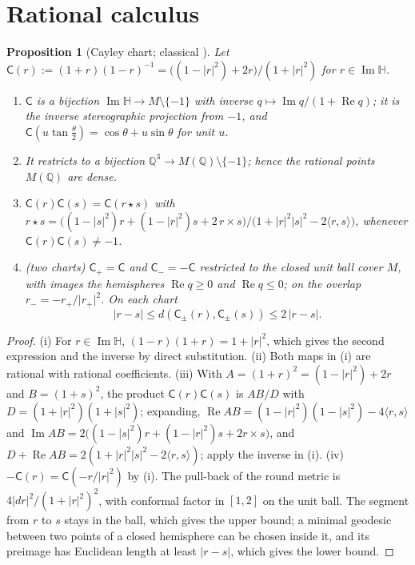 \documentclass[11pt,reqno]{amsart}
\newtheorem{proposition}[theorem]{Proposition}
\theoremstyle{definition}
\theoremstyle{remark}
\numberwithin{equation}{section}
\newcommand{\HH}{\mathbb{H}}
\newcommand{\Q}{\mathbb{Q}}
\newcommand{\re}{\operatorname{Re}}
\newcommand{\im}{\operatorname{Im}}
\newcommand{\ip}[2]{\langle #1,#2\rangle}
\newcommand{\Cay}{\mathsf{C}}
\begin{document}
\setcounter{section}{9}
\renewcommand{\thesection}{\arabic{section}}
\renewcommand{\theHsection}{\arabic{section}}

\section{Rational calculus}\label{sec:rational}

\begin{proposition}[Cayley chart; classical \cite{Cayley,Rodrigues,Shuster,SJ}]\label{prop:cayley}
Let $\Cay(r):=(1+r)(1-r)^{-1}=\bigl((1-\lvert r\rvert^2)+2r\bigr)/(1+\lvert r\rvert^2)$ for $r\in\im\HH$.
\begin{enumerate}[label=(\roman*)]
\item $\Cay$ is a bijection $\im\HH\to M\setminus\{-1\}$ with inverse $q\mapsto\im q/(1+\re q)$; it is the inverse
stereographic projection from $-1$, and $\Cay(u\tan\tfrac\theta2)=\cos\theta+u\sin\theta$ for unit $u$.
\item It restricts to a bijection $\Q^3\to M(\Q)\setminus\{-1\}$; hence the rational points $M(\Q)$ are dense.
\item $\Cay(r)\Cay(s)=\Cay(r\star s)$ with
$r\star s=\bigl((1-\lvert s\rvert^2)r+(1-\lvert r\rvert^2)s+2\,r\times s\bigr)/\bigl(1+\lvert r\rvert^2\lvert s\rvert^2-2\ip rs\bigr)$,
whenever $\Cay(r)\Cay(s)\ne-1$.
\item \emph{(two charts)} $\Cay_+=\Cay$ and $\Cay_-=-\Cay$ restricted to the closed unit ball cover $M$, with images
the hemispheres $\re q\ge0$ and $\re q\le0$; on the overlap $r_-=-r_+/\lvert r_+\rvert^2$.  On each chart
\[
\lvert r-s\rvert\le d(\Cay_\pm(r),\Cay_\pm(s))\le2\,\lvert r-s\rvert .
\]
\end{enumerate}
\end{proposition}
\begin{proof}
(i) For $r\in\im\HH$, $(1-r)(1+r)=1+\lvert r\rvert^2$, which gives the second expression and the inverse by direct
substitution.  (ii) Both maps in (i) are rational with rational coefficients.  (iii) With $A=(1+r)^2=(1-\lvert r\rvert^2)+2r$ and
$B=(1+s)^2$, the product $\Cay(r)\Cay(s)$ is $AB/D$ with $D=(1+\lvert r\rvert^2)(1+\lvert s\rvert^2)$;
expanding, $\re AB=(1-\lvert r\rvert^2)(1-\lvert s\rvert^2)-4\ip rs$ and
$\im AB=2\bigl((1-\lvert s\rvert^2)r+(1-\lvert r\rvert^2)s+2r\times s\bigr)$, and
$D+\re AB=2(1+\lvert r\rvert^2\lvert s\rvert^2-2\ip rs)$; apply the inverse in (i).  (iv) $-\Cay(r)=\Cay(-r/\lvert r\rvert^2)$ by (i).  The pull-back of the
round metric is $4\lvert dr\rvert^2/(1+\lvert r\rvert^2)^2$, with conformal factor in $[1,2]$ on the unit ball.
The segment from $r$ to $s$ stays in the ball, which gives the upper bound; a minimal geodesic between two
points of a closed hemisphere can be chosen inside it, and its preimage has Euclidean length at least
$\lvert r-s\rvert$, which gives the lower bound.
\end{proof}
\end{document}
